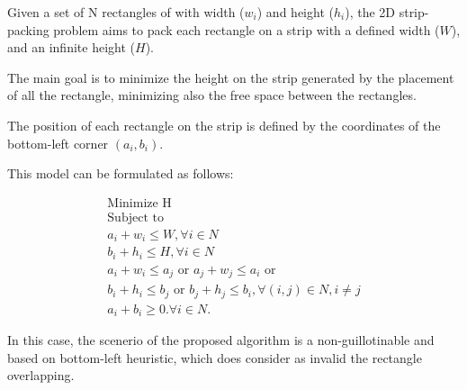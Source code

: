Given a set of N rectangles of with width ($w_{i}$) and height ($h_{i}$),
the 2D strip-packing problem aims to pack each rectangle on a strip
with a defined width ($W$), and an infinite height ($H$).

The main goal is to minimize the height on the strip
generated by the placement of all the rectangle,
minimizing also the free space between the rectangles.

The position of each rectangle on the strip is defined
by the coordinates of the bottom-left corner $(a_{i},b_{i})$.

This model can be formulated as follows:

\begin{eqnarray}
\text{Minimize H}\nonumber \\
\text{Subject to}\nonumber \\
a_{i} + w_{i} \leq W, \forall i \in N \\
b_{i} + h_{i} \leq H, \forall i \in N \\
a_{i} + w_{i} \leq a_{j}\text{ or }a_{j} + w_{j} \leq a_{i}\text{ or }\nonumber\\
b_{i} + h_{i} \leq b_{j}\text{ or }b_{j} + h_{j} \leq b_{i}, \forall (i,j) \in N, i\neq j\\
a_{i} + b_{i} \geq 0. \forall i \in N.
\end{eqnarray}

In this case,
the scenerio of the proposed algorithm is a non-guillotinable
and based on bottom-left heuristic, which does consider as invalid
the rectangle overlapping.
